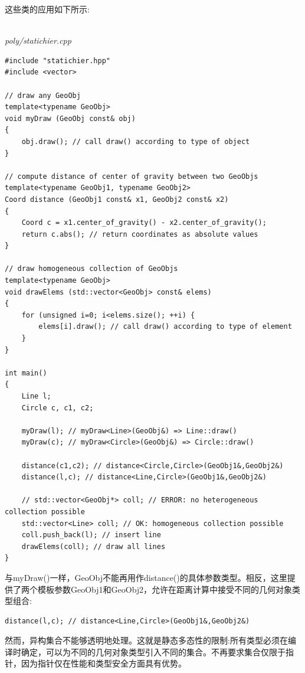 这些类的应用如下所示:

\hspace*{\fill} \\ %
\noindent
\textit{poly/statichier.cpp}
\begin{lstlisting}[style=styleCXX]
#include "statichier.hpp"
#include <vector>

// draw any GeoObj
template<typename GeoObj>
void myDraw (GeoObj const& obj)
{
	obj.draw(); // call draw() according to type of object
}

// compute distance of center of gravity between two GeoObjs
template<typename GeoObj1, typename GeoObj2>
Coord distance (GeoObj1 const& x1, GeoObj2 const& x2)
{
	Coord c = x1.center_of_gravity() - x2.center_of_gravity();
	return c.abs(); // return coordinates as absolute values
}

// draw homogeneous collection of GeoObjs
template<typename GeoObj>
void drawElems (std::vector<GeoObj> const& elems)
{
	for (unsigned i=0; i<elems.size(); ++i) {
		elems[i].draw(); // call draw() according to type of element
	}
}

int main()
{
	Line l;
	Circle c, c1, c2;
	
	myDraw(l); // myDraw<Line>(GeoObj&) => Line::draw()
	myDraw(c); // myDraw<Circle>(GeoObj&) => Circle::draw()
	
	distance(c1,c2); // distance<Circle,Circle>(GeoObj1&,GeoObj2&)
	distance(l,c); // distance<Line,Circle>(GeoObj1&,GeoObj2&)
	
	// std::vector<GeoObj*> coll; // ERROR: no heterogeneous collection possible
	std::vector<Line> coll; // OK: homogeneous collection possible
	coll.push_back(l); // insert line
	drawElems(coll); // draw all lines
}
\end{lstlisting}

与myDraw()一样，GeoObj不能再用作distance()的具体参数类型。相反，这里提供了两个模板参数GeoObj1和GeoObj2，允许在距离计算中接受不同的几何对象类型组合:

\begin{lstlisting}[style=styleCXX]
distance(l,c); // distance<Line,Circle>(GeoObj1&,GeoObj2&)
\end{lstlisting}

然而，异构集合不能够透明地处理。这就是静态多态性的限制:所有类型必须在编译时确定，可以为不同的几何对象类型引入不同的集合。不再要求集合仅限于指针，因为指针仅在性能和类型安全方面具有优势。


















